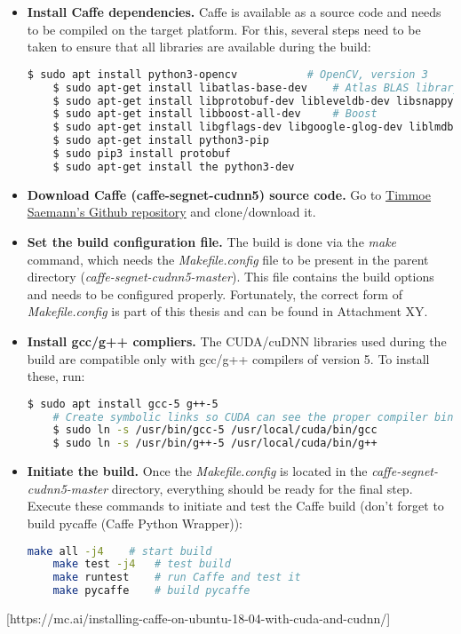 \begin{itemize}
		
	\item \textbf{Install Caffe dependencies.} Caffe is available as a source code and needs to be compiled on the target platform. For this, several steps need to be taken to ensure that all libraries are available during the build: 
	
	\begin{lstlisting}[language=bash]
	$ sudo apt install python3-opencv 			# OpenCV, version 3
	$ sudo apt-get install libatlas-base-dev 	# Atlas BLAS library
	$ sudo apt-get install libprotobuf-dev libleveldb-dev libsnappy-dev libopencv-dev libhdf5-serial-dev protobuf-compiler
	$ sudo apt-get install libboost-all-dev		# Boost
	$ sudo apt-get install libgflags-dev libgoogle-glog-dev liblmdb-dev
	$ sudo apt-get install python3-pip
	$ sudo pip3 install protobuf
	$ sudo apt-get install the python3-dev
	\end{lstlisting}
	
	\item \textbf{Download Caffe (caffe-segnet-cudnn5) source code.} Go to \href{https://github.com/TimoSaemann/caffe-segnet-cudnn5}{Timmoe Saemann's Github repository} and clone/download it. 
	\item \textbf{Set the build configuration file.} The build is done via the \textit{make} command, which needs the \textit{Makefile.config} file to be present in the parent directory (\textit{caffe-segnet-cudnn5-master}). This file contains the build options and needs to be configured properly. Fortunately, the correct form of \textit{Makefile.config} is part of this thesis and can be found in Attachment XY. 
	
	\item \textbf{Install gcc/g++ compliers.} The CUDA/cuDNN libraries used during the build are compatible only with gcc/g++ compilers of version 5. To install these, run:
	
	\begin{lstlisting}[language=bash]
	$ sudo apt install gcc-5 g++-5
	# Create symbolic links so CUDA can see the proper compiler binaries
	$ sudo ln -s /usr/bin/gcc-5 /usr/local/cuda/bin/gcc
	$ sudo ln -s /usr/bin/g++-5 /usr/local/cuda/bin/g++
	\end{lstlisting}
	
	\item \textbf{Initiate the build.} Once the \textit{Makefile.config} is located in the \textit{caffe-segnet-cudnn5-master} directory, everything should be ready for the final step. Execute these commands to initiate and test the Caffe build (don't forget to build pycaffe (Caffe Python Wrapper)):
	
	\begin{lstlisting}[language=bash]
	make all -j4	# start build
	make test -j4	# test build
	make runtest	# run Caffe and test it
	make pycaffe	# build pycaffe 
	\end{lstlisting} 	
\end{itemize}
[https://mc.ai/installing-caffe-on-ubuntu-18-04-with-cuda-and-cudnn/]





